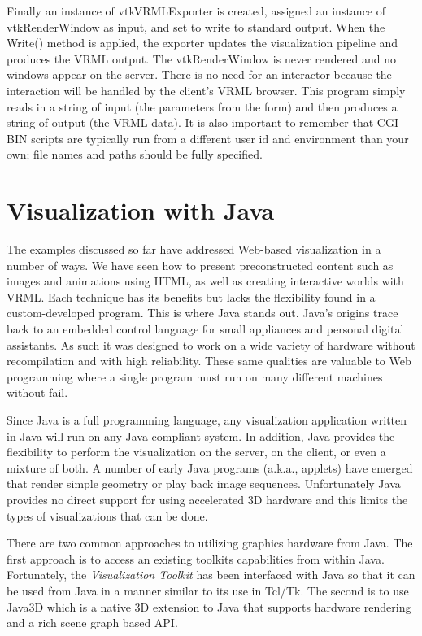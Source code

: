 Finally an instance of vtkVRMLExporter is created, assigned an instance of vtkRenderWindow as input, and set to write to standard output. When the Write() method is applied, the exporter updates the visualization pipeline and produces the VRML output. The vtkRenderWindow is never rendered and no windows appear on the server. There is no need for an interactor because the interaction will be handled by the client's VRML browser. This program simply reads in a string of input (the parameters from the form) and then produces a string of output (the VRML data). It is also important to remember that CGI--BIN scripts are typically run from a different user id and environment than your own; file names and paths should be fully specified.

\section{Visualization with Java}

The examples discussed so far have addressed Web-based visualization in a number of ways. We have seen how to present preconstructed content such as images and animations using HTML, as well as creating interactive worlds with VRML. Each technique has its benefits but lacks the flexibility found in a custom-developed program. This is where Java stands out. Java's origins trace back to an embedded control language for small appliances and personal digital assistants. As such it was designed to work on a wide variety of hardware without recompilation and with high reliability. These same qualities are valuable to Web programming where a single program must run on many different machines without fail.

Since Java is a full programming language, any visualization application written in Java will run on any Java-compliant system. In addition, Java provides the flexibility to perform the visualization on the server, on the client, or even a mixture of both. A number of early Java programs (a.k.a., applets) have emerged that render simple geometry or play back image sequences. Unfortunately Java provides no direct support for using accelerated 3D hardware and this limits the types of visualizations that can be done.

There are two common approaches to utilizing graphics hardware from Java. The first approach is to access an existing toolkits capabilities from within Java. Fortunately, the \emph{Visualization Toolkit} has been interfaced with Java so that it can be used from Java in a manner similar to its use in Tcl/Tk. The second is to use Java3D which is a native 3D extension to Java that supports hardware rendering and a rich scene graph based API.

